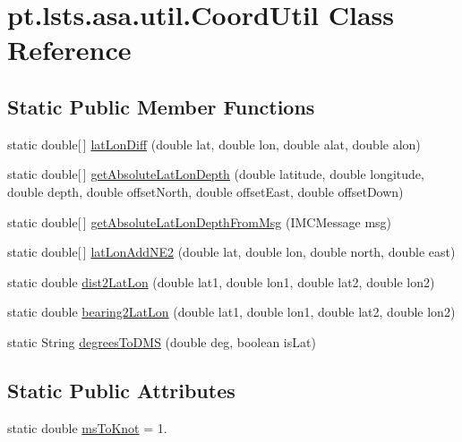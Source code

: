 \hypertarget{classpt_1_1lsts_1_1asa_1_1util_1_1CoordUtil}{}\section{pt.\+lsts.\+asa.\+util.\+Coord\+Util Class Reference}
\label{classpt_1_1lsts_1_1asa_1_1util_1_1CoordUtil}
\subsection*{Static Public Member Functions}
\begin{DoxyCompactItemize}
\item 
static double\mbox{[}$\,$\mbox{]} \hyperlink{classpt_1_1lsts_1_1asa_1_1util_1_1CoordUtil_a5f98c356c6cf3c9c37df74c6475c011e}{lat\+Lon\+Diff} (double lat, double lon, double alat, double alon)
\item 
static double\mbox{[}$\,$\mbox{]} \hyperlink{classpt_1_1lsts_1_1asa_1_1util_1_1CoordUtil_a759149da4682638afc21a06ccdef7bbb}{get\+Absolute\+Lat\+Lon\+Depth} (double latitude, double longitude, double depth, double offset\+North, double offset\+East, double offset\+Down)
\item 
static double\mbox{[}$\,$\mbox{]} \hyperlink{classpt_1_1lsts_1_1asa_1_1util_1_1CoordUtil_a332d10e8b90dd9457cc4354b8bffb21e}{get\+Absolute\+Lat\+Lon\+Depth\+From\+Msg} (I\+M\+C\+Message msg)
\item 
static double\mbox{[}$\,$\mbox{]} \hyperlink{classpt_1_1lsts_1_1asa_1_1util_1_1CoordUtil_a33e99d55311ff751cbc46a99fcdbf0b6}{lat\+Lon\+Add\+N\+E2} (double lat, double lon, double north, double east)
\item 
static double \hyperlink{classpt_1_1lsts_1_1asa_1_1util_1_1CoordUtil_a1b7343abbf6ea85f6e0790fa78536398}{dist2\+Lat\+Lon} (double lat1, double lon1, double lat2, double lon2)
\item 
static double \hyperlink{classpt_1_1lsts_1_1asa_1_1util_1_1CoordUtil_a515a435faa2da22468c1d751af0327f6}{bearing2\+Lat\+Lon} (double lat1, double lon1, double lat2, double lon2)
\item 
static String \hyperlink{classpt_1_1lsts_1_1asa_1_1util_1_1CoordUtil_abd94cc8e8ea8b675f76f6befce33746d}{degrees\+To\+D\+M\+S} (double deg, boolean is\+Lat)
\end{DoxyCompactItemize}
\subsection*{Static Public Attributes}
\begin{DoxyCompactItemize}
\item 
static double \hyperlink{classpt_1_1lsts_1_1asa_1_1util_1_1CoordUtil_abd45c1e9c896dcbf308a73420d2c0d33}{ms\+To\+Knot} = 1.
\end{DoxyCompactItemize}


